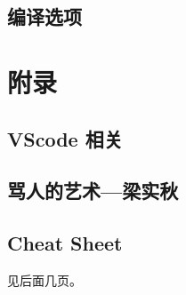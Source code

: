\documentclass[a4paper, twoside]{article}
\begin{document}
\begin{multicols}{2}
			\subsection{编译选项}
				
				




		\section{附录}
			
			\subsection{VScode 相关}
				
			
			\newpage
			\subsection{骂人的艺术—梁实秋}
				

	\end{multicols}
	
	\vspace{2em}
	\subsection{Cheat Sheet}
		见后面几页。

	

	

	

	\pagestyle{empty}


	\newpage

	\null


\end{document}
